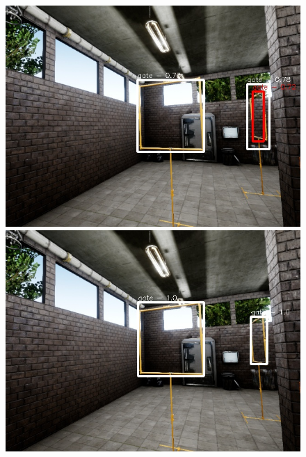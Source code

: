 \documentclass{article}
\begin{document}
\begin{figure}
	\centering
	\begin{minipage}{0.3\linewidth}
		\includegraphics[width=\linewidth]{fig/gate_comp}
	\end{minipage}
	\begin{minipage}{0.3\linewidth}
		\includegraphics[width=\linewidth]{fig/v2_comp}
	\end{minipage}


\end{figure}
\end{document}
